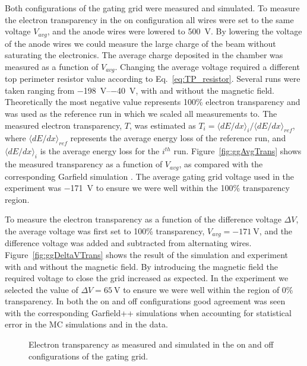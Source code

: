Both configurations of the gating grid were measured and simulated. To measure the electron transparency in the on configuration all wires were set to the same voltage $V_{avg}$, and the anode wires were lowered to \SI{500}{\volt}. By lowering the voltage of the anode wires we could measure the large charge of the beam without saturating the electronics. The average charge deposited in the chamber was measured as a function of $V_{avg}$. Changing the average voltage required a different top perimeter resistor value according to Eq.~\ref{eq:TP_resistor}. Several runs were taken ranging from \SIrange{-198}{-40}{\volt}, with and without the magnetic field. Theoretically the most negative value represents 100\% electron transparency and was used as the reference run in which we scaled all measurements to. The measured electron transparency, $T$, was estimated as $T_i = \langle dE/dx\rangle_i /{\langle dE/dx\rangle}_{ref}$, where $\langle dE/dx\rangle_{ref}$ represents the average energy loss of the reference run, and $\langle dE/dx\rangle_i$ is the average energy loss for the $i^{th}$ run. Figure~\ref{fig:ggAvgTrans} shows the measured transparency as a function of $V_{avg}$, as compared with the corresponding Garfield simulation \cite{garfield++}. The average gating grid voltage used in the experiment was \SI{-171}{\volt} to ensure we were well within the 100\% transparency region. 

To measure the electron transparency as a function of the difference voltage $\Delta V$, the average voltage was first set to 100\% transparency, $V_{avg}=\SI{-171}{\volt}$, and the difference voltage was added and subtracted from alternating wires. Figure~\ref{fig:ggDeltaVTrans} shows the result of the simulation and experiment with and without the magnetic field. By introducing the magnetic field the required voltage to close the grid increased as expected. In the experiment we selected the value of $\Delta V = \SI{65}{\volt}$ to ensure we were well within the region of 0\% transparency. In both the on and off configurations good agreement was seen with the corresponding Garfield++ simulations when accounting for statistical error in the MC simulations and in the data.   



\begin{figure}[!htb]%
    \centering
    \qquad
\caption{Electron transparency as measured and simulated in the on and off configurations of the gating grid.}    
\label{fig:ggTrans}
\end{figure}


